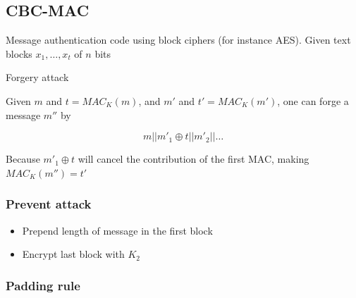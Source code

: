 \subsection{CBC-MAC}

Message authentication code using block ciphers (for instance
AES). Given text blocks $x_1, \ldots, x_t$ of $n$ bits

Forgery attack

Given $m$ and $t = MAC_K(m)$, and $m'$ and $t' = MAC_K(m')$, one can forge a message $m''$ by

\[ m || m'_1 \oplus t || m'_2 || \ldots \]

Because $m'_1 \oplus t$ will cancel the contribution of the first MAC, making $MAC_K(m'') = t'$

\subsubsection{Prevent attack}
\begin{itemize}
\item Prepend length of message in the first block
\item Encrypt last block with $K_2$
\end{itemize}

\subsubsection{Padding rule}
